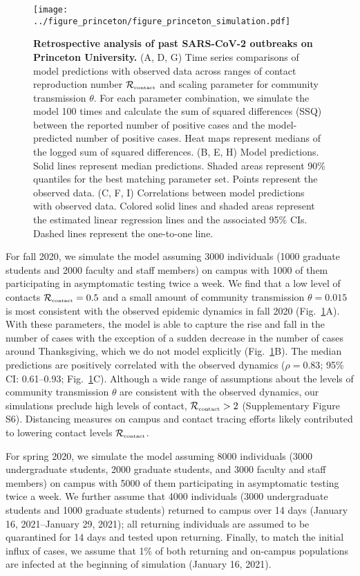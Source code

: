 \documentclass[12pt]{article}
\newcommand{\fref}[1]{Fig.~\ref{fig:#1}}
\newcommand{\Rx}[1]{\ensuremath{{\mathcal R}_{#1}}}
\newcommand{\Rc}{\Rx{\textrm{\tiny{contact}}}}
\begin{document}
\begin{figure}[!th]
\texttt{[image: ../figure\_princeton/figure\_princeton\_simulation.pdf]}
\caption{
\textbf{Retrospective analysis of past SARS-CoV-2 outbreaks on Princeton University.}
(A, D, G) Time series comparisons of model predictions with observed data across ranges of contact reproduction number $\Rc$ and scaling parameter for community transmission $\theta$.
For each parameter combination, we simulate the model 100 times and calculate the sum of squared differences (SSQ) between the reported number of positive cases and the model-predicted number of positive cases. 
Heat maps represent medians of the logged sum of squared differences.
(B, E, H) Model predictions. 
Solid lines represent median predictions.
Shaded areas represent 90\% quantiles for the best matching parameter set.
Points represent the observed data.
(C, F, I) Correlations between model predictions with observed data.
Colored solid lines and shaded areas represent the estimated linear regression lines and the associated 95\% CIs.
Dashed lines represent the one-to-one line.
\label{fig:matching}
}
\end{figure}

For fall 2020, we simulate the model assuming 3000 individuals (1000 graduate students and 2000 faculty and staff members) on campus with 1000 of them participating in asymptomatic testing twice a week.
We find that a low level of contacts $\Rc=0.5$ and a small amount of community transmission $\theta=0.015$ is most consistent with the observed epidemic dynamics in fall 2020 (\fref{matching}A).
With these parameters, the model is able to capture the rise and fall in the number of cases with the exception of a sudden decrease in the number of cases around Thanksgiving, which we do not model explicitly (\fref{matching}B).
The median predictions are positively correlated with the observed dynamics ($\rho = 0.83$; 95\% CI: 0.61--0.93; \fref{matching}C).
Although a wide range of assumptions about the levels of community transmission $\theta$ are consistent with the observed dynamics, our simulations preclude high levels of contact, $\Rc > 2$ (Supplementary Figure S6).
Distancing measures on campus and contact tracing efforts likely contributed to lowering contact levels $\Rc$.

For spring 2020, we simulate the model assuming 8000 individuals (3000 undergraduate students, 2000 graduate students, and 3000 faculty and staff members) on campus with 5000 of them participating in asymptomatic testing twice a week.
We further assume that 4000 individuals (3000 undergraduate students and 1000 graduate students) returned to campus over 14 days (January 16, 2021--January 29, 2021);
all returning individuals are assumed to be quarantined for 14 days and tested upon returning. 
Finally, to match the initial influx of cases, we assume that 1\% of both returning and on-campus populations are infected at the beginning of simulation (January 16, 2021).
\end{document}
